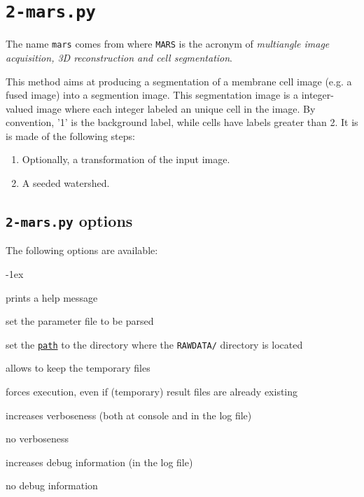 \section{\texttt{2-mars.py}}
\label{sec:cli:mars}

The name \texttt{mars} comes from \cite{fernandez:hal-00521491} where \texttt{MARS} is the acronym of \textit{multiangle image acquisition, 3D reconstruction and cell segmentation}.

This method aims at producing a segmentation of a membrane cell image (e.g.  a fused image) into a segmention image. This segmentation image is a integer-valued image where each integer labeled an unique cell in the image. By convention, '1' is the background label, while cells have labels greater than 2. It is  is made of the following steps:
\begin{enumerate}
\itemsep -1ex
\item  Optionally, a transformation of the input image.
\item A seeded watershed.
\end{enumerate}


\subsection{\texttt{2-mars.py} options}

The following options are available:
\begin{description}
  \itemsep -1ex
\item[\texttt{-h}] prints a help message
\item[\texttt{-p \underline{file}}] set the parameter file to be parsed
\item[\texttt{-e \underline{path}}] set the
  \texttt{\underline{path}} to the directory where the
  \texttt{RAWDATA/} directory is located
\item[\texttt{-k}] allows to keep the temporary files
\item[\texttt{-f}] forces execution, even if (temporary) result files
  are already existing
\item[\texttt{-v}] increases verboseness (both at console and in the
  log file)
\item[\texttt{-nv}] no verboseness
\item[\texttt{-d}]  increases debug information (in the
  log file)
\item[\texttt{-nd}] no debug information
\end{description}




